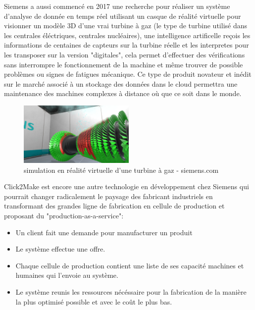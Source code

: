             Siemens a aussi commencé en 2017 une recherche pour réaliser un système d'analyse 
            de donnée en temps réel utilisant un casque de réalité virtuelle pour visionner 
            un modèle 3D d'une vrai turbine à gaz (le type de turbine utilisé dans les 
            centrales éléctriques, centrales nucléaires), une intelligence artificelle reçois les 
            informations de centaines de capteurs sur la turbine réelle et les interpretes
            pour les transposer sur la version "digitales", cela permet d'effectuer
            des vérifications sans interrompre le fonctionnement de la machine 
            et même trouver de possible problèmes ou signes de fatigues mécanique. \newline
            Ce type de produit novateur et inédit sur le marché associé à 
            un stockage des données dans le cloud permettra une maintenance 
            des machines complexes à distance où que ce soit dans le monde. \newline 

            \begin{figure}[H]
                \centering
                \includegraphics[width=0.5\textwidth]{Images/turbine}
                \caption{simulation en réalité virtuelle d'une turbine à gaz - siemens.com}
                \label{fig:gasturbine}
            \end{figure}


            Click2Make est encore une autre technologie en développement chez Siemens 
            qui pourrait changer radicalement le paysage des fabricant industriels
            en transformant des grandes ligne de fabrication en cellule de production 
            et proposant du "production-as-a-service": \newline
            \begin{itemize}
                \item Un client fait une demande pour manufacturer un produit
                \item Le système effectue une offre.
                \item Chaque cellule de production contient une liste de ses capacité machines et 
                humaines qui l'envoie au système.
                \item Le système reunis les ressources nécéssaire pour la fabrication de la manière
                la plus optimisé possible et avec le coût le plus bas. \newline
            \end{itemize}


